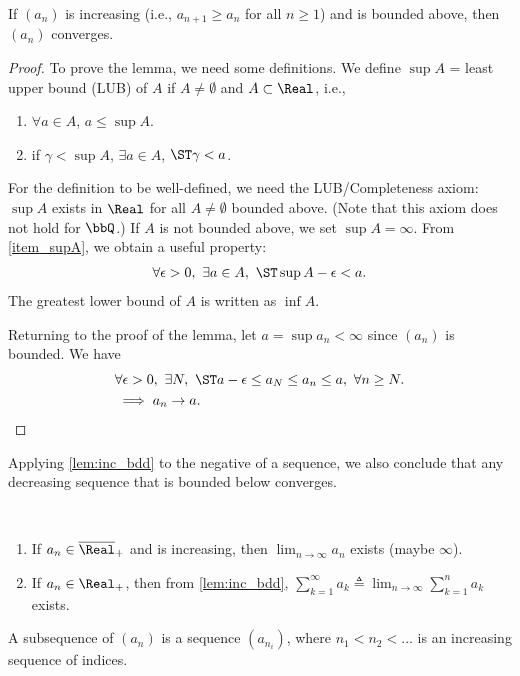 \documentclass[../aipt.tex]{subfiles}
\begin{document}
\begin{Lemma}\label{lem:inc_bdd}
If $(a_n)$ is increasing (i.e., $a_{n+1} \geq a_n$ for all $n\geq1$) and is bounded above, then $(a_n)$ converges.
\end{Lemma}
\begin{proof}
To prove the lemma, we need some definitions. We define $\sup{A}$ = least upper bound (LUB) of $A$ if $ A\neq \emptyset$ and $A \subset\Real$, i.e., 
\begin{enumerate}[1)]
\item $\forall a \in A$, $a \leq \sup{A}$.
\item if $\gamma < \sup{A}$, $\exists a \in A$, $\ST \gamma < a$. \label{item_supA}
\end{enumerate}
For the definition to be well-defined, we need the \rm{LUB/Completeness axiom}: $\sup{A}$ exists in $\Real$ for all $A\ne\emptyset$ bounded above. (Note that this axiom does not hold for $\bbQ$.) If $A$ is not bounded above, we set $\sup A = \infty$. From \cref{item_supA}, we obtain a useful property:
\begin{align*}
\forall \epsilon > 0,\ \exists a \in A,\ \ST \sup{A} - \epsilon < a.
\end{align*}
The greatest lower bound of $A$ is written as $\inf A$.

Returning to the proof of the lemma, let $a = \sup{a_n} < \infty$ since $(a_n)$ is bounded. We have 
\begin{align*}
&\forall \epsilon > 0,\ \exists N,\ \ST a - \epsilon \leq a_N \leq a_n \leq a,\ \forall n \geq N. \\
&\implies a_n \to a.
\end{align*}
\end{proof}
Applying \cref{lem:inc_bdd} to the negative of a sequence, we also conclude that any decreasing sequence that is bounded below converges.

\begin{Remark}\
\begin{enumerate}
	\item If $a_n\in \overline{\Real}_+$ and is increasing, then $\lim_{n\to\infty} a_n$ exists (maybe $\infty$).
	\item If $a_n\in\Real_+$, then from \cref{lem:inc_bdd}, $\sum_{k=1}^\infty a_k \triangleq \lim_{n\to\infty} \sum_{k=1}^n a_k$ exists. 
\end{enumerate}
\end{Remark}

\begin{Definition}
A subsequence of $(a_n)$ is a sequence $(a_{n_i})$, where $n_1 < n_2 < \ldots$ is an increasing sequence of indices.
\end{Definition}
\end{document}
